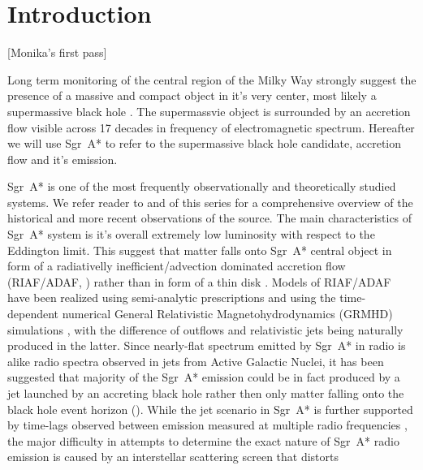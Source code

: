 \section{Introduction}\label{sec:intro}

\color{red}
[Monika's first pass]
\color{black}

Long term monitoring of the central region of the Milky Way strongly suggest the presence of a massive and compact object in it's very center, most likely a supermassive black hole \citep{2019A&A...625L..10G,2019Sci...365..664D}. The supermassvie object is surrounded by an accretion flow visible across 17 decades in frequency of electromagnetic spectrum. Hereafter we will use Sgr~A* to refer to the supermassive black hole candidate, accretion flow and it's emission.

Sgr~A* is one of the most frequently observationally and theoretically studied systems.  We refer reader to  and  of this series for a comprehensive overview of the historical and more recent observations of the source. The main characteristics of Sgr~A* system is it's overall extremely low luminosity with respect to the Eddington limit. This suggest that matter falls onto Sgr~A* central object in form of a radiativelly inefficient/advection dominated accretion flow (RIAF/ADAF, \citealt{1977ApJ...214..840I,1994ApJ...428L..13N, 1995ApJ...444..231N,
  1995ApJ...452..710N, 1996A&AS..120C.287N, 1998ApJ...492..554N,2014ARA&A..52..529Y}) rather than in form of a thin disk \citep{1973A&A....24..337S}. Models of RIAF/ADAF have been realized using semi-analytic prescriptions \citep[e.g.,][]{1995Natur.374..623N,2000ApJ...541..234O, 2009ApJ...697...45B,2011ApJ...735..110B,2018ApJ...863..148P} and using the time-dependent numerical General Relativistic Magnetohydrodynamics (GRMHD) simulations \citep[e.g.,][]{2000ApJ...528..462H, 2003ApJ...589..458D,
  2003ApJ...589..444G, 2007CQGra..24S.235G, 2012ApJS..201....9F,
  2014ApJ...796...22F, 2016ApJS..225...22W, 2017ApJS..231...17A,
  2018JPhCS1031a2008O, 2019A&A...629A..61O, 2019ApJS..243...26P}, with the difference of outflows and
relativistic jets being naturally produced in the latter. Since nearly-flat spectrum emitted by Sgr~A* in radio is alike radio spectra observed in jets from Active Galactic Nuclei, it has been suggested that majority of the Sgr~A* emission could be in fact produced by a jet launched by an accreting black hole rather then only matter falling onto the black hole event horizon (\citealt{2000A&A...362..113F,2004A&A...414..895F, 2005ApJ...635.1203M, 2013A&A...559L...3M}).  While the jet scenario in Sgr~A* is further supported by time-lags observed between emission measured at multiple radio frequencies \citep{2015A&A...576A..41B,2021arXiv210713402B}, the major difficulty in attempts to determine the exact nature of Sgr~A* radio emission is caused by an interstellar scattering screen that distorts
